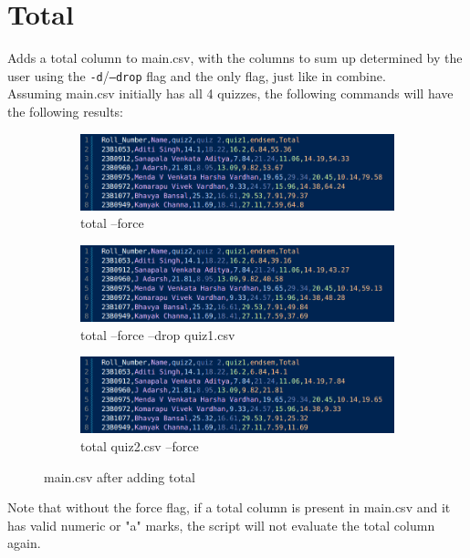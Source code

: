 \documentclass{article}
\begin{document}
    \section{Total}
    Adds a total column to main.csv, with the columns to sum up determined by the user using the \texttt{-d}/\texttt{--drop} flag and the only flag, just like in combine.\\
    Assuming main.csv initially has all 4 quizzes, the following commands will have the following results:
    \begin{figure}[htbp]
        \centering
        \begin{subfigure}[b]{0.32\textwidth}
            \centering
            \includegraphics[width=\textwidth]{Total_All.png}
            \caption{total --force}
            \label{fig:sub1}
        \end{subfigure}
        \hfill
        \begin{subfigure}[b]{0.32\textwidth}
            \centering
            \includegraphics[width=\textwidth]{Total_drop_quiz1.png}
            \caption{total --force --drop quiz1.csv}
            \label{fig:sub2}
        \end{subfigure}
        \hfill
        \begin{subfigure}[b]{0.32\textwidth}
            \centering
            \includegraphics[width=\textwidth]{Total_only_quiz2.png}
            \caption{total quiz2.csv --force}
            \label{fig:sub3}
        \end{subfigure}
        \caption{main.csv after adding total}
        \label{fig:total}
    \end{figure}
    Note that without the force flag, if a total column is present in main.csv and it has valid numeric or "a" marks, the script will not evaluate the total column again.\\
    
\end{document}
